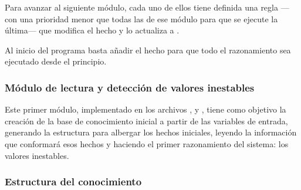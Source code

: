 \documentclass[a4paper, 11pt, titlepage]{article}
\begin{document}
    Para avanzar al siguiente módulo, cada uno de ellos tiene definida una regla ---con una prioridad menor que todas las de ese módulo para que se ejecute la última--- que modifica el hecho  y lo actualiza a .

    Al inicio del programa basta añadir el hecho  para que todo el razonamiento sea ejecutado desde el principio.

    \subsubsection{Módulo de lectura y detección de valores inestables}
    \label{ch:modLectura}

    Este primer módulo, implementado en los archivos ,  y , tiene como objetivo la creación de la base de conocimiento inicial a partir de las variables de entrada, generando la estructura para albergar los hechos iniciales, leyendo la información que conformará esos hechos y haciendo el primer razonamiento del sistema: los valores inestables.

    \subsubsection*{Estructura del conocimiento}
\end{document}
